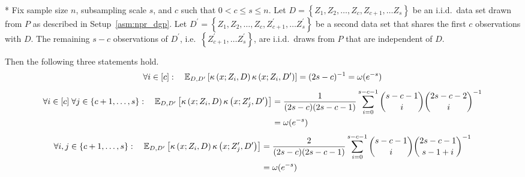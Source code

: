 \begin{lem}[]\label{lem:expec_kernel_prod}\mbox{}\\*
    Fix sample size $n$, subsampling scale $s$, and $c$ such that $0 < c \leq s \leq n$.
	Let $D = \left\{Z_1, Z_2, \dotsc, Z_c, Z_{c+1}, \dotsc Z_s \right\}$ be an i.i.d.\ data set drawn from $P$ as described in Setup~\ref{asm:npr_dgp}.
	Let $D^{\prime} = \left\{Z_1, Z_2, \dotsc, Z_c, Z_{c+1}^{\prime}, \dotsc Z_s^{\prime} \right\}$ be a second data set that shares the first $c$ observations with $D$.
	The remaining $s - c$ observations of $D^{\prime}$, i.e.\ $\left\{Z_{c+1}^{\prime}, \dotsc Z_s^{\prime} \right\}$, are i.i.d.\ draws from $P$ that are independent of $D$.

    Then the following three statements hold.
    \begin{equation}
        \forall i \in [c]: \quad
        \mathbb{E}_{D, D^{\prime}}\left[\kappa\left(x; Z_{i}, D\right)\kappa\left(x; Z_{i}, D^{\prime}\right)\right]
        = (2s - c)^{-1} = \omega(e^{-s})
    \end{equation}
    \begin{equation}
        \begin{aligned}
            \forall i \in [c] \; \forall j \in \{c+1, \dotsc, s\}: \quad
            \mathbb{E}_{D, D^{\prime}}\left[\kappa\left(x; Z_{i}, D\right)\kappa\left(x; Z_{j}^{\prime}, D^{\prime}\right)\right]
            & = \frac{1}{(2s - c)(2s-c-1)}\sum_{i = 0}^{s - c - 1}\binom{s - c - 1}{i}\binom{2s - c - 2}{i}^{-1} \\
            & = \omega(e^{-s})
        \end{aligned}
    \end{equation}
    \begin{equation}
        \begin{aligned}
            \forall i,j \in \{c+1, \dotsc, s\}: \quad
            \mathbb{E}_{D, D^{\prime}}\left[\kappa\left(x; Z_{i}, D\right)\kappa\left(x; Z_{j}^{\prime}, D^{\prime}\right)\right]
            & = \frac{2}{(2s-c)(2s-c-1)}\sum_{i = 0}^{s-c-1} \binom{s - c - 1}{i}\binom{2s - c - 1}{s-1+i}^{-1}\\
            & = \omega(e^{-s})
        \end{aligned}
    \end{equation}
\end{lem}

